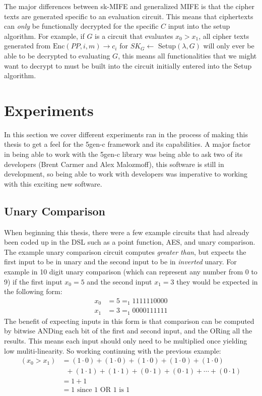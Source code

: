 \documentclass[12pt,twoside]{reedthesis}
\newcommand{\enc}[0]{\text{Enc}}
\begin{document}
   \par The major differences between sk-MIFE and generalized MIFE is that the cipher texts are generated specific to an evaluation circuit. This means that ciphertexts can \textit{only} be functionally decrypted for the specific $C$ input into the setup algorithm. For example, if $G$ is a circuit that evaluates $x_0>x_1$, all cipher texts generated from $\enc(PP,i,m) \to c_i$ for $SK_G \leftarrow$ Setup$(\lambda,G)$ will only ever be able to be decrypted to evaluating $G$, this means all functionalities that we might want to decrypt to must be built into the circuit initially entered into the Setup algorithm.

         
         
         
    \section{Experiments}
    In this section we cover different experiments ran in the process of making this thesis to get a feel for the 5gen-c framework and its capabilities. A major factor in being able to work with the 5gen-c library was being able to ask two of its developers (Brent Carmer and Alex Malozmoff), this software is still in development, so being able to work with developers was imperative to working with this exciting new software. 
   
   
   \subsection{Unary Comparison}
   \par When beginning this thesis, there were a few example circuits that had already been coded up in the DSL such as a point function, AES, and unary comparison. The example unary comparison circuit computes \textit{greater than}, but expects the first input to be in unary and the second input to be in \textit{inverted} unary. For example in 10 digit unary comparison (which can represent any number from 0 to 9) if the first input $x_0 = 5$ and the second input $x_1=3$ they would be expected in the following form:
   \begin{align*}
   x_0 &= 5 =_1 1111110000 \\
   x_1 &= 3 =_1 0000111111
   \end{align*}
   The benefit of expecting inputs in this form is that comparison can be computed by bitwise ANDing each bit of the first and second input, and the ORing all the results. This means each input should only need to be multiplied once yielding low muliti-linearity. So working continuing with the previous example:
   \begin{align*}
   (x_0> x_1) &= (1\cdot 0) + (1 \cdot 0) + (1 \cdot 0) + (1 \cdot 0) + (1 \cdot 0) \\ & \; \;+ (1 \cdot 1) + (1 \cdot 1) + (0 \cdot 1) +(0 \cdot 1) + \cdots + (0 \cdot 1) \\
   &= 1 + 1\\
   &= 1 \text{ since 1 OR 1 is 1}
   \end{align*}
   
\end{document}
